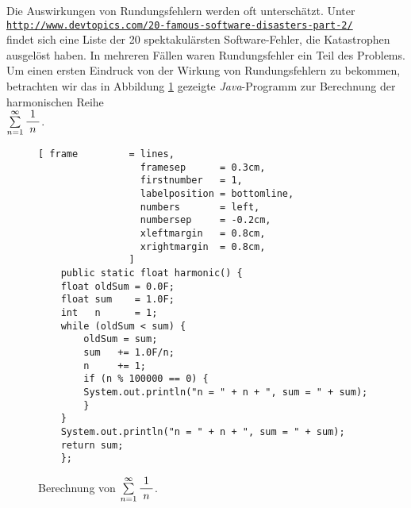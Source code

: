 Die Auswirkungen von Rundungsfehlern werden oft untersch\"atzt.  Unter
\\[0.2cm]
\hspace*{1.3cm}
\href{http://www.devtopics.com/20-famous-software-disasters-part-2/}{\texttt{http://www.devtopics.com/20-famous-software-disasters-part-2/}}
\\[0.2cm]
findet sich eine Liste der 20 spektakul\"arsten Software-Fehler, die Katastrophen ausgel\"ost haben.
In mehreren F\"allen waren Rundungsfehler ein Teil des Problems.  Um einen ersten Eindruck von der Wirkung
von Rundungsfehlern zu bekommen, betrachten wir das in Abbildung \ref{fig:Harmonic.java} gezeigte
\textsl{Java}-Programm zur Berechnung der harmonischen Reihe
\\[0.2cm]
\hspace*{1.3cm}
$\sum\limits_{n=1}^\infty \displaystyle\frac{\;\displaystyle1\;}{\;\displaystyle n\;}$.

\begin{figure}[!ht]
\centering
\begin{Verbatim}[ frame         = lines, 
                  framesep      = 0.3cm, 
                  firstnumber   = 1,
                  labelposition = bottomline,
                  numbers       = left,
                  numbersep     = -0.2cm,
                  xleftmargin   = 0.8cm,
                  xrightmargin  = 0.8cm,
                ]
    public static float harmonic() {
	float oldSum = 0.0F;
	float sum    = 1.0F;
	int   n      = 1;
	while (oldSum < sum) {
	    oldSum = sum;
	    sum   += 1.0F/n;
	    n     += 1;
	    if (n % 100000 == 0) {
		System.out.println("n = " + n + ", sum = " + sum);
	    }
	}
	System.out.println("n = " + n + ", sum = " + sum);
	return sum;
    };
\end{Verbatim}
\vspace*{-0.3cm}
\caption{Berechnung von $\sum\limits_{n=1}^\infty \displaystyle\frac{\;\displaystyle1\;}{\;\displaystyle n\;}$.}
\label{fig:Harmonic.java}
\end{figure}


